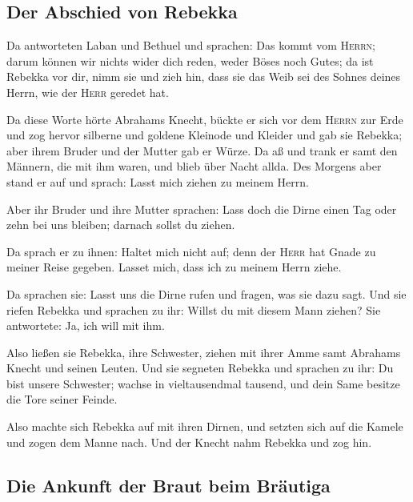 \hypertarget{der-abschied-von-rebekka}{%
\subsection{Der Abschied von Rebekka}\label{der-abschied-von-rebekka}}

 Da antworteten Laban und Bethuel und sprachen: Das kommt
vom \textsc{Herrn}; darum können wir nichts wider dich reden, weder
Böses noch Gutes;  da ist Rebekka vor dir, nimm sie und
zieh hin, dass sie das Weib sei des Sohnes deines Herrn, wie der
\textsc{Herr} geredet hat.

 Da diese Worte hörte Abrahams Knecht, bückte er sich vor
dem \textsc{Herrn} zur Erde  und zog hervor silberne und
goldene Kleinode und Kleider und gab sie Rebekka; aber ihrem Bruder und
der Mutter gab er Würze.  Da aß und trank er samt den
Männern, die mit ihm waren, und blieb über Nacht allda. Des Morgens aber
stand er auf und sprach: Lasst mich ziehen zu meinem Herrn.

 Aber ihr Bruder und ihre Mutter sprachen: Lass doch die
Dirne einen Tag oder zehn bei uns bleiben; darnach sollst du ziehen.

 Da sprach er zu ihnen: Haltet mich nicht auf; denn der
\textsc{Herr} hat Gnade zu meiner Reise gegeben. Lasset mich, dass ich
zu meinem Herrn ziehe.

 Da sprachen sie: Lasst uns die Dirne rufen und fragen,
was sie dazu sagt.  Und sie riefen Rebekka und sprachen
zu ihr: Willst du mit diesem Mann ziehen? Sie antwortete: Ja, ich will
mit ihm.

 Also ließen sie Rebekka, ihre Schwester, ziehen mit
ihrer Amme samt Abrahams Knecht und seinen Leuten.  Und
sie segneten Rebekka und sprachen zu ihr: Du bist unsere Schwester;
wachse in vieltausendmal tausend, und dein Same besitze die Tore seiner
Feinde.

 Also machte sich Rebekka auf mit ihren Dirnen, und
setzten sich auf die Kamele und zogen dem Manne nach. Und der Knecht
nahm Rebekka und zog hin.

\hypertarget{die-ankunft-der-braut-beim-bruxe4utiga}{%
\subsection{Die Ankunft der Braut beim
Bräutiga}\label{die-ankunft-der-braut-beim-bruxe4utiga}}

